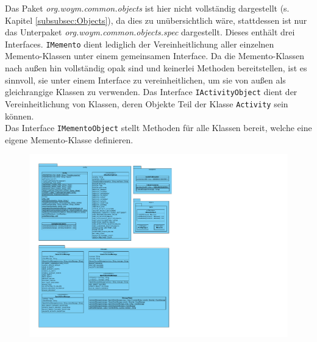 \documentclass[fontsize=12pt,paper=a4,twoside]{scrartcl}
\begin{document}
Das Paket \textit{org.woym.common.objects} ist hier nicht vollständig dargestellt (s. Kapitel \ref{subsubsec:Objects}), da dies zu unübersichtlich wäre, stattdessen ist nur das Unterpaket \textit{org.woym.common.objects.spec} dargestellt. Dieses enthält drei Interfaces. \texttt{IMemento} dient lediglich der Vereinheitlichung aller einzelnen Memento-Klassen unter einem gemeinsamen Interface. Da die Memento-Klassen nach außen hin vollständig opak sind und keinerlei Methoden bereitstellen, ist es sinnvoll, sie unter einem Interface zu vereinheitlichen, um sie von außen als gleichrangige Klassen zu verwenden. Das Interface \texttt{IActivityObject} dient der Vereinheitlichung von Klassen, deren Objekte Teil der Klasse \texttt{Activity} sein können. \\
Das Interface \texttt{IMementoObject} stellt Methoden für alle Klassen bereit, welche eine eigene Memento-Klasse definieren.\clearpage


\begin{figure}[H]
\includegraphics[width=\textwidth]{common.pdf}
\end{figure}
\newpage
\end{document}
